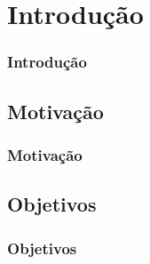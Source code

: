 \section{Introdução}


\begin{frame}\frametitle{Introdução}

\end{frame}

\subsection{Motivação}
    \begin{frame}\frametitle{Motivação}
    \end{frame}

\subsection{Objetivos}
    \begin{frame}\frametitle{Objetivos}
    \end{frame}

